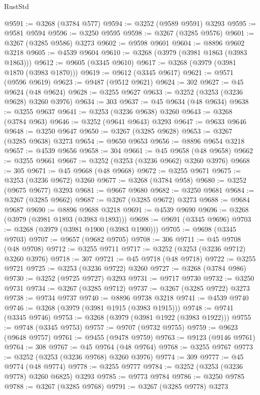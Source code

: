 \begin{lexlean}{RustStd}
\begin{coremodule}
@9591 := @3268 (@3784 @577)
@9594 := @3252 (@9589 @9591) @3293
@9595 := @9581 @9594
@9596 := @3250 @9595
@9598 := @3267 (@3285 @9576)
@9601 := @3267 (@3285 @9586) @3273
@9602 := @9598 @9601
@9604 := @8896 @9602 @3218
@9605 := @4539 @9604
@9610 := @3268 (@3979 (@3981 @1863 (@3983 @1863)))
@9612 := @9605 (@3345 @9610)
@9617 := @3268 (@3979 (@3981 @1870 (@3983 @1870)))
@9619 := @9612 (@3345 @9617)
@9621 := @9571 (@9596 @9619)
@9623 := @9487 (@9512 @9621)
@9624 := 302
@9627 := @45 @9624 (@48 @9624)
@9628 := @3255 @9627
@9633 := @3252 (@3253 (@3236 @9628) @3260 @3976)
@9634 := 303
@9637 := @45 @9634 (@48 @9634)
@9638 := @3255 @9637
@9641 := @3253 (@3236 @9638) @3260
@9643 := @3268 (@3784 @963)
@9646 := @3252 (@9641 @9643) @3293
@9647 := @9633 @9646
@9648 := @3250 @9647
@9650 := @3267 (@3285 @9628)
@9653 := @3267 (@3285 @9638) @3273
@9654 := @9650 @9653
@9656 := @8896 @9654 @3218
@9657 := @4539 @9656
@9658 := 304
@9661 := @45 @9658 (@48 @9658)
@9662 := @3255 @9661
@9667 := @3252 (@3253 (@3236 @9662) @3260 @3976)
@9668 := 305
@9671 := @45 @9668 (@48 @9668)
@9672 := @3255 @9671
@9675 := @3253 (@3236 @9672) @3260
@9677 := @3268 (@3784 @958)
@9680 := @3252 (@9675 @9677) @3293
@9681 := @9667 @9680
@9682 := @3250 @9681
@9684 := @3267 (@3285 @9662)
@9687 := @3267 (@3285 @9672) @3273
@9688 := @9684 @9687
@9690 := @8896 @9688 @3218
@9691 := @4539 @9690
@9696 := @3268 (@3979 (@3981 @1893 (@3983 @1893)))
@9698 := @9691 (@3345 @9696)
@9703 := @3268 (@3979 (@3981 @1900 (@3983 @1900)))
@9705 := @9698 (@3345 @9703)
@9707 := @9657 (@9682 @9705)
@9708 := 306
@9711 := @45 @9708 (@48 @9708)
@9712 := @3255 @9711
@9717 := @3252 (@3253 (@3236 @9712) @3260 @3976)
@9718 := 307
@9721 := @45 @9718 (@48 @9718)
@9722 := @3255 @9721
@9725 := @3253 (@3236 @9722) @3260
@9727 := @3268 (@3784 @986)
@9730 := @3252 (@9725 @9727) @3293
@9731 := @9717 @9730
@9732 := @3250 @9731
@9734 := @3267 (@3285 @9712)
@9737 := @3267 (@3285 @9722) @3273
@9738 := @9734 @9737
@9740 := @8896 @9738 @3218
@9741 := @4539 @9740
@9746 := @3268 (@3979 (@3981 @1915 (@3983 @1915)))
@9748 := @9741 (@3345 @9746)
@9753 := @3268 (@3979 (@3981 @1922 (@3983 @1922)))
@9755 := @9748 (@3345 @9753)
@9757 := @9707 (@9732 @9755)
@9759 := @9623 (@9648 @9757)
@9761 := @9455 (@9478 @9759)
@9763 := @9123 (@9146 @9761)
@9764 := 308
@9767 := @45 @9764 (@48 @9764)
@9768 := @3255 @9767
@9773 := @3252 (@3253 (@3236 @9768) @3260 @3976)
@9774 := 309
@9777 := @45 @9774 (@48 @9774)
@9778 := @3255 @9777
@9784 := @3252 (@3253 (@3236 @9778) @3260 @6825) @3293
@9785 := @9773 @9784
@9786 := @3250 @9785
@9788 := @3267 (@3285 @9768)
@9791 := @3267 (@3285 @9778) @3273

\end{coremodule}
\end{lexlean}
